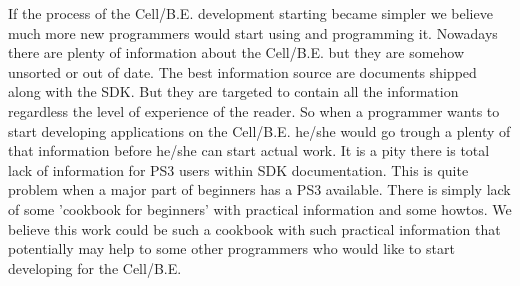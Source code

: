 \par
If the process of the \mbox{Cell/B.E.} development starting became simpler we believe much more new programmers would start using and programming it.
Nowadays there are plenty of information about the \mbox{Cell/B.E.} but they are somehow unsorted or out of date.
The best information source are documents shipped along with the SDK.
But they are targeted to contain all the information regardless the level of experience of the reader.
So when a programmer wants to start developing applications on the \mbox{Cell/B.E.} he/she would go trough a plenty of that information before he/she can start actual work.
It is a pity there is total lack of information for PS3 users within SDK documentation.
This is quite problem when a major part of beginners has a PS3 available.
There is simply lack of some 'cookbook for beginners' with practical information and some howtos.
We believe this work could be such a cookbook with such practical information that potentially may help to some other programmers who would like to start developing for the \mbox{Cell/B.E.}
